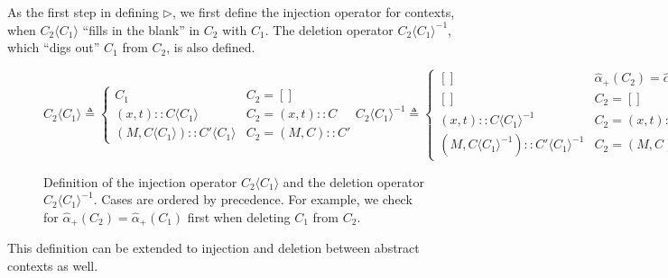 \documentclass{article}
\theoremstyle{definition}
\newcommand*{\cons}{::}
\newcommand*{\A}[1]{\widehat{#1}}
\newcommand*{\inject}[2]{{#2}\langle{#1}\rangle}
\newcommand*{\delete}[2]{{#2}{\langle{#1}\rangle}^{-1}}
\begin{document}
As the first step in defining $\rhd$, we first define the injection operator for contexts, when $\inject{C_1}{C_2}$ ``fills in the blank'' in $C_2$ with $C_1$.
The deletion operator $\delete{C_1}{C_2}$, which ``digs out'' $C_1$ from $C_2$, is also defined.
\begin{figure}[h!]
  \[
    \inject{C_{1}}{C_{2}}\triangleq
    \begin{cases}
      C_1                                           & C_{2}=[]            \\
      (x, t)\cons\inject{C_{1}}{C}                  & C_{2}=(x,t)\cons C  \\
      (M, \inject{C_{1}}{C})\cons\inject{C_{1}}{C'} & C_{2}=(M,C)\cons C'
    \end{cases}
    \delete{C_{1}}{C_{2}}\triangleq
    \begin{cases}
      []                                            & \A\alpha_+(C_{2})=\A\alpha_+(C_{1}) \\
      []                                            & C_{2}=[]                            \\
      (x,t)\cons\delete{C_{1}}{C}                   & C_{2}=(x,t)\cons C                  \\
      (M, \delete{C_{1}}{C})\cons\delete{C_{1}}{C'} & C_{2}=(M, C)\cons C'
    \end{cases}
  \]
  \caption{Definition of the injection operator $\inject{C_1}{C_2}$ and the deletion operator $\delete{C_1}{C_2}$.
    Cases are ordered by precedence.
    For example, we check for $\A\alpha_+(C_2)=\A\alpha_+(C_1)$ first when deleting $C_1$ from $C_2$.}
  \label{fig:concinject}
\end{figure}
This definition can be extended to injection and deletion between abstract contexts as well.
\end{document}
